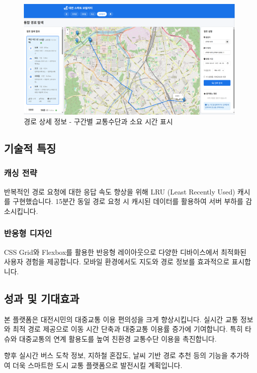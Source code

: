 \begin{figure}[h]
    \includegraphics[width=\columnwidth]{2/daejeon-4.png}
    \caption{경로 상세 정보 - 구간별 교통수단과 소요 시간 표시}
    \label{fig:route_details}
\end{figure}

\subsection{기술적 특징}

\subsubsection{캐싱 전략}
반복적인 경로 요청에 대한 응답 속도 향상을 위해 LRU (Least Recently Used) 캐시를 구현했습니다. 15분간 동일 경로 요청 시 캐시된 데이터를 활용하여 서버 부하를 감소시킵니다.

\subsubsection{반응형 디자인}
CSS Grid와 Flexbox를 활용한 반응형 레이아웃으로 다양한 디바이스에서 최적화된 사용자 경험을 제공합니다. 모바일 환경에서도 지도와 경로 정보를 효과적으로 표시합니다.

\subsection{성과 및 기대효과}
본 플랫폼은 대전시민의 대중교통 이용 편의성을 크게 향상시킵니다. 실시간 교통 정보와 최적 경로 제공으로 이동 시간 단축과 대중교통 이용률 증가에 기여합니다. 특히 타슈와 대중교통의 연계 활용도를 높여 친환경 교통수단 이용을 촉진합니다.

향후 실시간 버스 도착 정보, 지하철 혼잡도, 날씨 기반 경로 추천 등의 기능을 추가하여 더욱 스마트한 도시 교통 플랫폼으로 발전시킬 계획입니다.